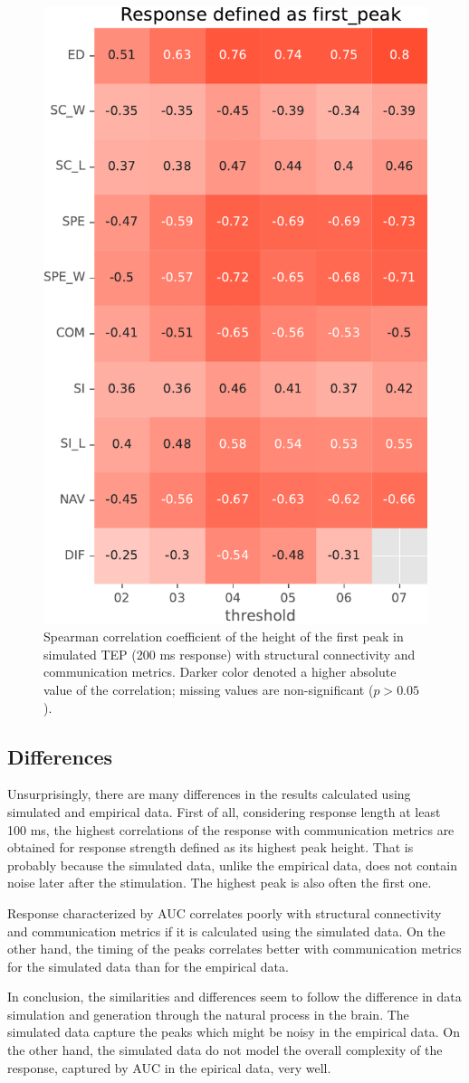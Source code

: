 \begin{figure}
    \centering
    \includegraphics[height=\textwidth]{images/nootebook_generated/pytepfit_results/simulated/200/not_over_threshold_nan/Response defined as first_peak.pdf}
    \caption[TEPs first peak (200 ms) correlations (simulated data)]{Spearman correlation coefficient of the height of the first peak in simulated TEP (200 ms response) with structural connectivity and communication metrics. Darker color denoted a higher absolute value of the correlation; missing values are non-significant ($p>0.05$).}
    \label{fig:tms_first_200_simulated}
\end{figure}

\subsection{Differences}

Unsurprisingly, there are many differences in the results calculated using simulated and empirical data. First of all, considering response length at least 100 ms, the highest correlations of the response with communication metrics are obtained for response strength defined as its highest peak height. That is probably because the simulated data, unlike the empirical data, does not contain noise later after the stimulation. The highest peak is also often the first one.

Response characterized by AUC correlates poorly with structural connectivity and communication metrics if it is calculated using the simulated data. On the other hand, the timing of the peaks correlates better with communication metrics for the simulated data than for the empirical data. 

In conclusion, the similarities and differences seem to follow the difference in data simulation and generation through the natural process in the brain. The simulated data capture the peaks which might be noisy in the empirical data. On the other hand, the simulated data do not model the overall complexity of the response, captured by AUC in the epirical data, very well.